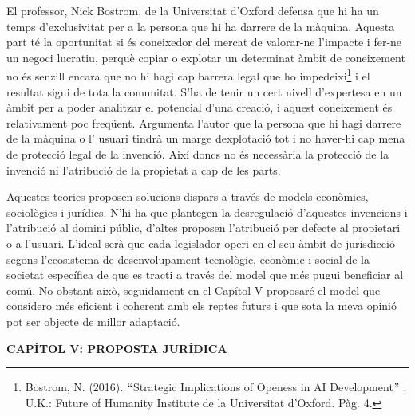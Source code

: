 \documentclass[12pt]{article}
\renewcommand{\_}{\kern-1.5pt\textunderscore\kern-1.5pt}
\begin{document}
\begin{itemize}
\vspace{\baselineskip}
\begin{justify}
El professor, Nick Bostrom,  de la Universitat d’Oxford defensa que hi ha un temps d’exclusivitat per a la persona que hi ha darrere de la màquina. Aquesta part té la oportunitat si és coneixedor del mercat de valorar-ne l’impacte i fer-ne un negoci lucratiu, perquè copiar o explotar un determinat àmbit de coneixement no és senzill encara que no hi hagi cap barrera legal que ho impedeixi\footnote{ Bostrom, N. (2016). $``$Strategic Implications of Openess in AI Development$"$ . U.K.: Future of Humanity Institute de la Universitat d’Oxford. Pàg. 4.  } i el resultat sigui de tota la comunitat. S’ha de tenir un cert nivell d’expertesa en un àmbit per a poder analitzar el potencial d’una creació, i aquest coneixement és relativament poc freqüent. Argumenta l’autor que la persona que hi hagi darrere de la màquina o l’ usuari tindrà un marge dexplotació tot i no haver-hi cap mena de protecció legal de la invenció. Així doncs no és necessària la protecció de la invenció ni l’atribució de la propietat a cap de les parts. 
\end{justify}\par


\vspace{\baselineskip}
\begin{justify}
Aquestes teories proposen solucions dispars a través de models econòmics, sociològics i jurídics. N’hi ha que plantegen la desregulació d’aquestes invencions i l’atribució al domini públic, d’altes proposen l’atribució per defecte al propietari o a l’usuari. L’ideal serà que cada legislador operi en el seu àmbit de jurisdicció segons l’ecosistema de desenvolupament tecnològic, econòmic i social de la societat específica de que es tracti a través del model que més pugui beneficiar al comú. No obstant això, seguidament en el Capítol V proposaré el model que considero més eficient i coherent amb els reptes futurs i que sota la meva opinió pot ser objecte de millor adaptació. 
\end{justify}\par


\vspace{\baselineskip}
\begin{Center}
{\fontsize{16pt}{19.2pt}\selectfont \textbf{CAPÍTOL V: PROPOSTA JURÍDICA}\par}
\end{Center}\par



\end{itemize}
\end{document}
